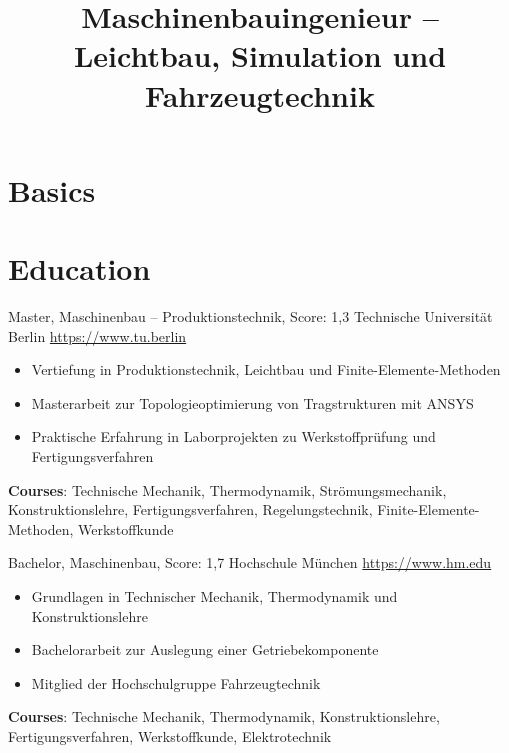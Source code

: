 \documentclass[a4paper, serif, 10pt]{moderncv}
\title{Maschinenbauingenieur – Leichtbau, Simulation und Fahrzeugtechnik}
\begin{document}
\maketitle

\section{Basics}

\section{Education}

        {Master, Maschinenbau – Produktionstechnik, Score: 1,3}
        {Technische Universität Berlin}
        {\url{https://www.tu.berlin}}
        {}
        {\begin{itemize}
\item Vertiefung in Produktionstechnik, Leichtbau und Finite-Elemente-Methoden
\item Masterarbeit zur Topologieoptimierung von Tragstrukturen mit ANSYS
\item Praktische Erfahrung in Laborprojekten zu Werkstoffprüfung und Fertigungsverfahren
\end{itemize}
\textbf{Courses}: Technische Mechanik, Thermodynamik, Strömungsmechanik, Konstruktionslehre, Fertigungsverfahren, Regelungstechnik, Finite-Elemente-Methoden, Werkstoffkunde}

        {Bachelor, Maschinenbau, Score: 1,7}
        {Hochschule München}
        {\url{https://www.hm.edu}}
        {}
        {\begin{itemize}
\item Grundlagen in Technischer Mechanik, Thermodynamik und Konstruktionslehre
\item Bachelorarbeit zur Auslegung einer Getriebekomponente
\item Mitglied der Hochschulgruppe Fahrzeugtechnik
\end{itemize}
\textbf{Courses}: Technische Mechanik, Thermodynamik, Konstruktionslehre, Fertigungsverfahren, Werkstoffkunde, Elektrotechnik}
\end{document}
